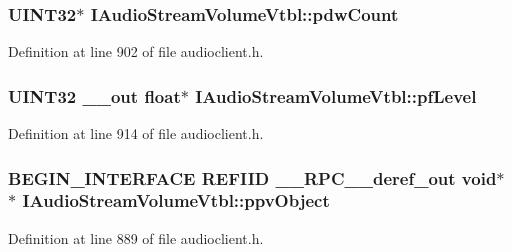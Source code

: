 \subsubsection[{\texorpdfstring{pdw\+Count}{pdwCount}}]{ U\+I\+N\+T32$\ast$ I\+Audio\+Stream\+Volume\+Vtbl\+::pdw\+Count}\hypertarget{struct_i_audio_stream_volume_vtbl_a2d190b0784dfb69966bb939efea621fb}{}\label{struct_i_audio_stream_volume_vtbl_a2d190b0784dfb69966bb939efea621fb}


Definition at line 902 of file audioclient.\+h.

\subsubsection[{\texorpdfstring{pf\+Level}{pfLevel}}]{ U\+I\+N\+T32 {\bf \+\_\+\+\_\+out} float$\ast$ I\+Audio\+Stream\+Volume\+Vtbl\+::pf\+Level}\hypertarget{struct_i_audio_stream_volume_vtbl_a94c2d7ee2965c34db6b8ecdce92979d4}{}\label{struct_i_audio_stream_volume_vtbl_a94c2d7ee2965c34db6b8ecdce92979d4}


Definition at line 914 of file audioclient.\+h.

\subsubsection[{\texorpdfstring{ppv\+Object}{ppvObject}}]{\setlength{\rightskip}{0pt plus 5cm}B\+E\+G\+I\+N\+\_\+\+I\+N\+T\+E\+R\+F\+A\+CE {\bf R\+E\+F\+I\+ID} {\bf \+\_\+\+\_\+\+R\+P\+C\+\_\+\+\_\+deref\+\_\+out} {\bf void}$\ast$$\ast$ I\+Audio\+Stream\+Volume\+Vtbl\+::ppv\+Object}\hypertarget{struct_i_audio_stream_volume_vtbl_a59cd8b13777d8692e2e9b9cb2f3fdeef}{}\label{struct_i_audio_stream_volume_vtbl_a59cd8b13777d8692e2e9b9cb2f3fdeef}


Definition at line 889 of file audioclient.\+h.

